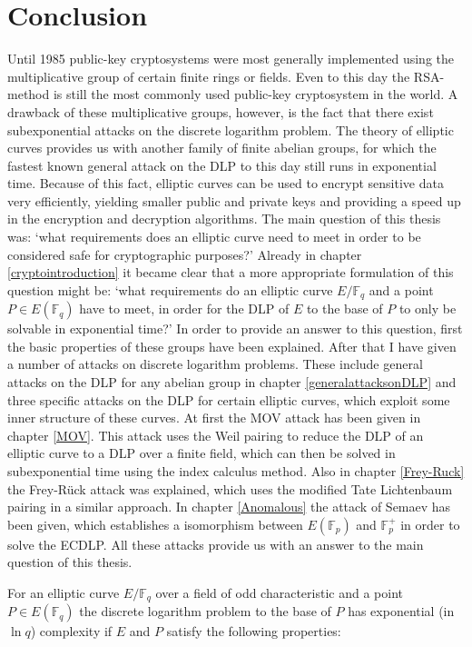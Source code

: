 \documentclass{article}
\numberwithin{equation}{section}
\theoremstyle{definition}
\newcommand{\FF}[1]{{\mathbb F}_{#1}} %
\begin{document}
 \newpage




\section{Conclusion}
Until 1985 public-key cryptosystems were most generally implemented using the multiplicative group of certain finite rings or fields. Even to this day the RSA-method is still the most commonly used public-key cryptosystem in the world. A drawback of these multiplicative groups, however, is the fact that there exist subexponential attacks on the discrete logarithm problem. The theory of elliptic curves provides us with another family of finite abelian groups, for which the fastest known general attack on the DLP to this day still runs in exponential time. Because of this fact, elliptic curves can be used to  encrypt sensitive data very efficiently, yielding smaller public and private keys and providing a speed up in the encryption and decryption algorithms. The main question of this thesis was: `what requirements does an elliptic curve need to meet in order to be considered safe for cryptographic purposes?' Already in chapter \ref{cryptointroduction} it became clear that a more appropriate formulation of this question might be: `what requirements do an elliptic curve $E/\FF{q}$ and a point $P\in E(\FF{q})$ have to meet, in order for the DLP of $E$ to the base of $P$ to only be solvable in exponential time?' In order to provide an answer to this question, first the basic properties of these groups have been explained. After that I have given a number of attacks on discrete logarithm problems. These include general attacks on the DLP for any abelian group in chapter \ref{generalattacksonDLP} and three specific attacks on the DLP for certain elliptic curves, which exploit some inner structure of these curves. At first the MOV attack has been given in chapter \ref{MOV}. This attack uses the Weil pairing to reduce the DLP of an elliptic curve to a DLP over a finite field, which can then be solved in subexponential time using the index calculus method. Also in chapter \ref{Frey-Ruck} the Frey-R\"uck attack was explained, which uses the modified Tate Lichtenbaum pairing in a similar approach. In chapter \ref{Anomalous} the attack of Semaev has been given, which establishes a isomorphism between $E(\FF{p})$ and $\FF{p}^+$ in order to solve the ECDLP. All these attacks provide us with an answer to the main question of this thesis. \par 
For an elliptic curve $E/\FF{q}$ over a field of odd characteristic and a point $P \in E(\FF{q})$ the discrete logarithm problem to the base of $P$ has exponential (in $\ln q$) complexity if $E$ and $P$ satisfy the following properties:
\end{document}
